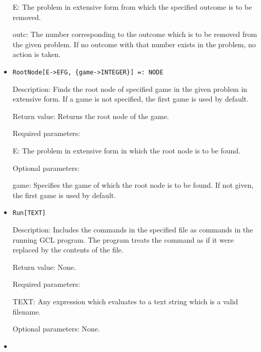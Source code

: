 \begin{itemize}
\bd
\item
[E:] The problem in extensive form from which the specified outcome is
to be removed.
\item
[outc:] The number corresponding to the outcome which is to be removed
from the given problem.  If no outcome with that number exists in the
problem, no action is taken.
\ed
\ed

\item
\protect \large \begin{verbatim}
RootNode[E->EFG, {game->INTEGER}] =: NODE
\end{verbatim}\normalsize

\bd
\item
[Description:] Finds the root node of specified game in the given
problem in extensive form.  If a game is not specified, the first game
is used by default.
\item
[Return value:] Returns the root node of the game.
\item
[Required parameters:]\hfil\null
	
\bd
\item
[E:] The problem in extensive form in which the root node is to be
found.
\ed

\item
[Optional parameters:]\hfil\null

\bd
\item
[game:] Specifies the game of which the root node is to be found.  If
not given, the first game is used by default.
\ed
\ed

\item

\protect \large \begin{verbatim}
Run[TEXT]
\end{verbatim}\normalsize

\bd
\item
[Description:] Includes the commands in the specified file as commands
in the running GCL program.  The program treats the command as if it
were replaced by the contents of the file.
\item
[Return value:] None.
\item
[Required parameters:]\hfil\null
	
\bd
\item
[TEXT:] Any expression which evaluates to a text string which is a
valid filename.
\ed

\item
[Optional parameters:] None.
\ed

\item


\end{itemize}
